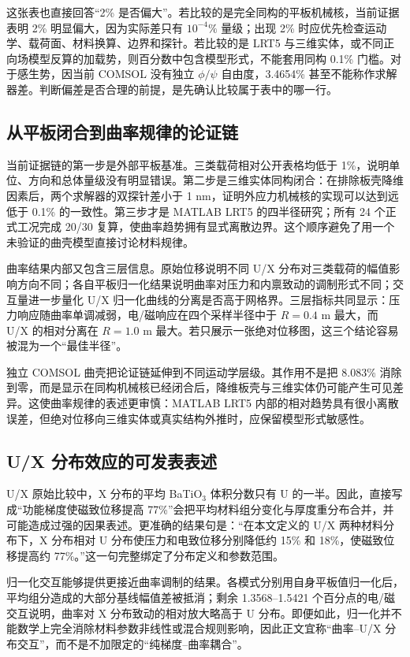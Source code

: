 \documentclass[UTF8,fontset=windows,11pt,a4paper]{ctexart}
\begin{document}
这张表也直接回答“2\% 是否偏大”。若比较的是完全同构的平板机械核，当前证据表明 2\% 明显偏大，因为实际差只有 $10^{-4}\%$ 量级；出现 2\% 时应优先检查运动学、载荷面、材料换算、边界和探针。若比较的是 LRT5 与三维实体，或不同正向场模型反算的加载势，则百分数中包含模型形式，不能套用同构 0.1\% 门槛。对于感生势，因当前 COMSOL 没有独立 $\phi/\psi$ 自由度，3.4654\% 甚至不能称作求解器差。判断偏差是否合理的前提，是先确认比较属于表中的哪一行。

\subsection{从平板闭合到曲率规律的论证链}

当前证据链的第一步是外部平板基准。三类载荷相对公开表格均低于 1\%，说明单位、方向和总体量级没有明显错误。第二步是三维实体同构闭合：在排除板壳降维因素后，两个求解器的双探针差小于 1 nm，证明外应力机械核的实现可以达到远低于 0.1\% 的一致性。第三步才是 MATLAB LRT5 的四半径研究；所有 24 个正式工况完成 20/30 复算，使曲率趋势拥有显式离散边界。这个顺序避免了用一个未验证的曲壳模型直接讨论材料规律。

曲率结果内部又包含三层信息。原始位移说明不同 U/X 分布对三类载荷的幅值影响方向不同；各自平板归一化结果说明曲率对压力和内禀致动的调制形式不同；交互量进一步量化 U/X 归一化曲线的分离是否高于网格界。三层指标共同显示：压力响应随曲率单调减弱，电/磁响应在四个采样半径中于 $R=0.4$ m 最大，而 U/X 的相对分离在 $R=1.0$ m 最大。若只展示一张绝对位移图，这三个结论容易被混为一个“最佳半径”。

独立 COMSOL 曲壳把论证链延伸到不同运动学层级。其作用不是把 8.083\% 消除到零，而是显示在同构机械核已经闭合后，降维板壳与三维实体仍可能产生可见差异。这使曲率规律的表述更审慎：MATLAB LRT5 内部的相对趋势具有很小离散误差，但绝对位移向三维实体或真实结构外推时，应保留模型形式敏感性。

\subsection{U/X 分布效应的可发表表述}

U/X 原始比较中，X 分布的平均 BaTiO$_3$ 体积分数只有 U 的一半。因此，直接写成“功能梯度使磁致位移提高 77\%”会把平均材料组分变化与厚度重分布合并，并可能造成过强的因果表述。更准确的结果句是：“在本文定义的 U/X 两种材料分布下，X 分布相对 U 分布使压力和电致位移分别降低约 15\% 和 18\%，使磁致位移提高约 77\%。”这一句完整绑定了分布定义和参数范围。

归一化交互能够提供更接近曲率调制的结果。各模式分别用自身平板值归一化后，平均组分造成的大部分基线幅值差被抵消；剩余 1.3568--1.5421 个百分点的电/磁交互说明，曲率对 X 分布致动的相对放大略高于 U 分布。即便如此，归一化并不能数学上完全消除材料参数非线性或混合规则影响，因此正文宜称“曲率--U/X 分布交互”，而不是不加限定的“纯梯度--曲率耦合”。
\end{document}
